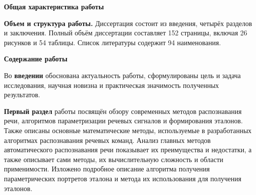 \begin{center}
{\fontsize{11}{13}\selectfont \textbf{Общая характеристика работы}}
\end{center}

\newcommand{\actuality}{\underline{\textbf{\actualityTXT}}}
\newcommand{\progress}{\underline{\textbf{\progressTXT}}}
\newcommand{\aim}{\underline{{\textbf\aimTXT}}}
\newcommand{\tasks}{\underline{\textbf{\tasksTXT}}}
\newcommand{\novelty}{\underline{\textbf{\noveltyTXT}}}
\newcommand{\influence}{\underline{\textbf{\influenceTXT}}}
\newcommand{\methods}{\underline{\textbf{\methodsTXT}}}
\newcommand{\defpositions}{\underline{\textbf{\defpositionsTXT}}}
\newcommand{\reliability}{\underline{\textbf{\reliabilityTXT}}}
\newcommand{\probation}{\underline{\textbf{\probationTXT}}}
\newcommand{\contribution}{\underline{\textbf{\contributionTXT}}}
\newcommand{\publications}{\underline{\textbf{\publicationsTXT}}}



\textbf{Объем и структура работы.} Диссертация состоит из введения, четырёх разделов и заключения. Полный объём диссертации составляет 152 страницы, включая 26 рисунков и 54 таблицы. Список литературы содержит 94 наименования.

\newpage
\begin{center}
	{\fontsize{11}{13}\selectfont \textbf{Содержание работы} \vspace{-1.5ex}}
\end{center}

Во \textbf{введении} обоснована актуальность работы, сформулированы цель и задача исследования, научная новизна и практическая значимость полученных результатов.

\textbf{Первый раздел} работы посвящён обзору современных методов распознавания речи, алгоритмов параметризации речевых сигналов и формирования эталонов.
Также описаны основные математические методы, используемые в разработанных алгоритмах распознавания речевых команд.
Анализ главных методов автоматического распознавания речи показывает их преимущества и недостатки, а также описывает сами методы, их вычислительную сложность и области применимости.
Изложено подробное описание алгоритма получения параметрических портретов эталона и метода их использования для получения эталонов.

